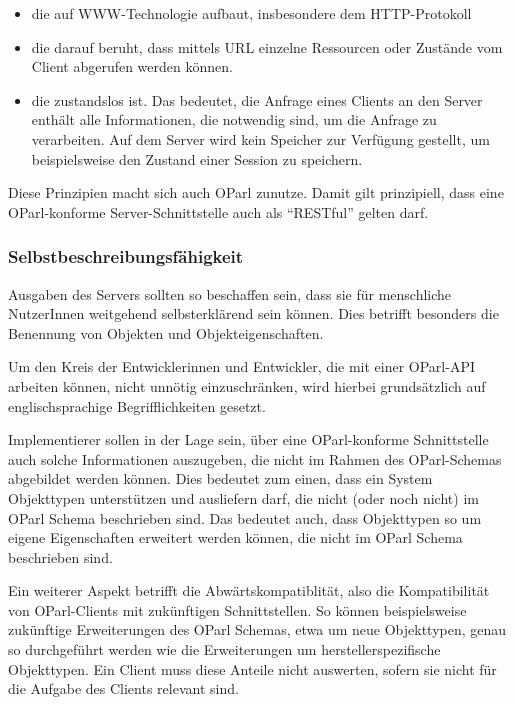 \documentclass[,a4paper]{article}
\begin{document}
\begin{itemize}
\itemsep1pt\parskip0pt
\item
  die auf WWW-Technologie aufbaut, insbesondere dem HTTP-Protokoll
\item
  die darauf beruht, dass mittels URL einzelne Ressourcen oder Zustände
  vom Client abgerufen werden können.
\item
  die zustandslos ist. Das bedeutet, die Anfrage eines Clients an den
  Server enthält alle Informationen, die notwendig sind, um die Anfrage
  zu verarbeiten. Auf dem Server wird kein Speicher zur Verfügung
  gestellt, um beispielsweise den Zustand einer Session zu speichern.
\end{itemize}

Diese Prinzipien macht sich auch OParl zunutze. Damit gilt prinzipiell,
dass eine OParl-konforme Server-Schnittstelle auch als ``RESTful''
gelten darf.

\subsubsection{Selbstbeschreibungsfähigkeit}\label{selbstbeschreibungsfuxe4higkeit}

Ausgaben des Servers sollten so beschaffen sein, dass sie für
menschliche NutzerInnen weitgehend selbsterklärend sein können. Dies
betrifft besonders die Benennung von Objekten und Objekteigenschaften.

Um den Kreis der Entwicklerinnen und Entwickler, die mit einer OParl-API
arbeiten können, nicht unnötig einzuschränken, wird hierbei
grundsätzlich auf englischsprachige Begrifflichkeiten gesetzt.


Implementierer sollen in der Lage sein, über eine OParl-konforme
Schnittstelle auch solche Informationen auszugeben, die nicht im Rahmen
des OParl-Schemas abgebildet werden können. Dies bedeutet zum einen,
dass ein System Objekttypen unterstützen und ausliefern darf, die nicht
(oder noch nicht) im OParl Schema beschrieben sind. Das bedeutet auch,
dass Objekttypen so um eigene Eigenschaften erweitert werden können, die
nicht im OParl Schema beschrieben sind.

Ein weiterer Aspekt betrifft die Abwärtskompatiblität, also die
Kompatibilität von OParl-Clients mit zukünftigen Schnittstellen. So
können beispielsweise zukünftige Erweiterungen des OParl Schemas, etwa
um neue Objekttypen, genau so durchgeführt werden wie die Erweiterungen
um herstellerspezifische Objekttypen. Ein Client muss diese Anteile
nicht auswerten, sofern sie nicht für die Aufgabe des Clients relevant
sind.
\end{document}
